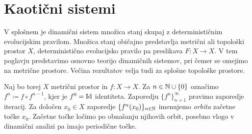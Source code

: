 \section{Kaotični sistemi} \label{sec:dis}

V splošnem je dinamični sistem množica stanj skupaj z determinističnim evolucijskim pravilom. Množica stanj običajno predstavlja metrični ali topološki prostor \(X\), deterministično evolucijsko pravilo pa preslikava \(F \colon X \to X\). V tem poglavju predstavimo osnovno teorijo dinamičnih sistemov, pri čemer se omejimo na metrične prostore. Večina rezultatov velja tudi za splošne topološke prostore.

Naj bo torej \(X\) metrični prostor in \(f \colon X \to X\). Za \(n \in \mathbb N \cup \{0\}\) označimo \(f^n \coloneq f \circ f^{n - 1}\), kjer je \(f^0 = \operatorname{Id}\) identiteta. Zaporedju \(\{f^n\}_{n=1}^{\infty}\) pravimo zaporedje iteracij. Za določen \(x_0 \in X\) zaporedje \(\{f^n (x_0)\}_{n \in \mathbb N}\) imenujemo \emph{orbita} začetne točke \(x_0\). Začetne točke ločimo po obnašanju njihovih orbit, posebno vlogo v dinamični analizi pa imajo periodične točke.






